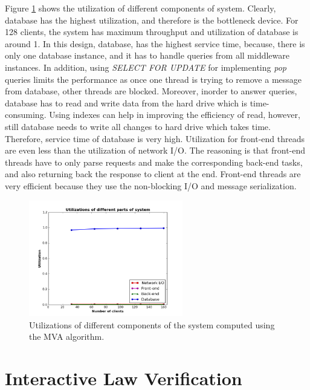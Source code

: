 \documentclass[11pt]{article}
\begin{document}
Figure \ref{fig:utilization} shows the utilization of different components of system.
Clearly, database has the highest utilization, and therefore is the bottleneck device.
For 128 clients, the system has maximum throughput \cite[section~3.3]{ms1} and utilization of database is around 1. In this design, database, has the highest
service time, because, there is only one database instance, and it has to handle queries from all
middleware instances. In addition, using \emph{SELECT FOR UPDATE} for implementing  
\emph{pop} queries limits the performance as once one thread is trying to remove a 
message from database, other threads are blocked. Moreover, inorder to answer queries, database has to read and write 
data from the hard drive which is time-consuming. Using indexes can help in improving the 
efficiency of read, however, still database needs to write all changes to hard drive which
takes time. Therefore, service time of database is very high. Utilization for front-end
threads are even less than the utilization of network I/O. The reasoning is that front-end threads have 
to only parse requests and make the corresponding back-end tasks, and also returning back the 
response to client at the end. Front-end threads are very efficient because they use the non-blocking I/O and message
serialization. 

\begin{figure}[H]
  \includegraphics[width=0.6\textwidth,page=1]{figures/utilization/utilizations}
  \centering
  \caption{Utilizations of different components of the system computed using the MVA algorithm.}
  \label{fig:utilization}
\end{figure}

\section{Interactive Law Verification}\label{sec:interactive-law}
\end{document}
